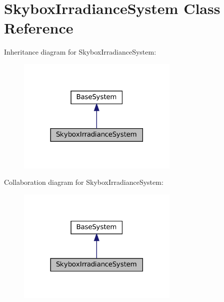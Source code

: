 \hypertarget{classSkyboxIrradianceSystem}{}\section{Skybox\+Irradiance\+System Class Reference}
\label{classSkyboxIrradianceSystem}


Inheritance diagram for Skybox\+Irradiance\+System\+:
\nopagebreak
\begin{figure}[H]
\begin{center}
\leavevmode
\includegraphics[width=218pt]{classSkyboxIrradianceSystem__inherit__graph}
\end{center}
\end{figure}


Collaboration diagram for Skybox\+Irradiance\+System\+:
\nopagebreak
\begin{figure}[H]
\begin{center}
\leavevmode
\includegraphics[width=218pt]{classSkyboxIrradianceSystem__coll__graph}
\end{center}
\end{figure}
